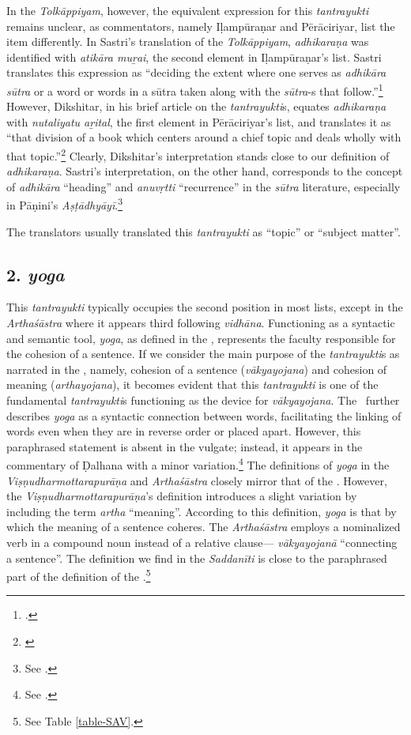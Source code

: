 In the \emph{Tolkāppiyam}, however, the equivalent expression for this \emph{tantrayukti} remains unclear, as commentators, namely Iḷampūraṇar and Pērāciriyar, list the item differently. In Sastri's translation of the \emph{Tolkāppiyam}, \emph{adhikaraṇa} was identified with \emph{atikāra muṟai}, the second element in Iḷampūraṇar's list. Sastri translates this expression as “deciding the extent where one serves as \emph{adhikāra sūtra} or a word or words in a sūtra taken along with the \emph{sūtra}-s that follow.”\footnote{\cite[233]{sast-1936}.} However, Dikshitar, in his brief article on the \emph{tantrayukti}s, equates \emph{adhikaraṇa} with \emph{nutaliyatu aṟital}, the first element in Pērāciriyar's list, and translates it as “that division of a book which centers around a chief topic and deals wholly with that topic.”\footnote{\cite[85]{diks-1930}} Clearly, Dikshitar's interpretation stands close to our definition of \emph{adhikaraṇa}. Sastri's interpretation, on the other hand, corresponds to the concept of \emph{adhikāra} “heading” and \emph{anuvṛtti} “recurrence” in the \emph{sūtra} literature, especially in Pāṇini's \emph{Aṣṭādhyāyī}.\footnote{See \cite[111]{chev-2009}.} 

The translators usually translated this \emph{tantrayukti} as “topic” or “subject matter”. 

\subsection{2. \emph{yoga}}

This \emph{tantrayukti} typically occupies the second position in most lists, except in the \emph{Arthaśāstra} where it appears third following \emph{vidhāna}. Functioning as a syntactic and semantic tool, \emph{yoga}, as defined in the \SS, represents the faculty responsible for the cohesion of a sentence. If we consider the main purpose of the \emph{tantrayukti}s as narrated in the \SS, namely, cohesion of a sentence (\emph{vākyayojana}) and cohesion of meaning (\emph{arthayojana}), it becomes evident that this \emph{tantrayukti} is one of the fundamental \emph{tantrayukti}s functioning as the device for \emph{vākyayojana}. The \SS\ further describes \emph{yoga} as a syntactic connection between words, facilitating the linking of words even when they are in reverse order or placed apart. However, this paraphrased statement is absent in the vulgate; instead, it appears in the commentary of Ḍalhana with a minor variation.\footnote{See .} The definitions of \emph{yoga} in the \emph{Viṣṇudharmottarapurāṇa} and \emph{Arthaśāstra} closely mirror that of the \SS. However, the \emph{Viṣṇudharmottarapurāṇa}'s definition introduces a slight variation by including the term \emph{artha} “meaning”. According to this definition, \emph{yoga} is that by which the meaning of a sentence coheres. The \emph{Arthaśāstra} employs a nominalized verb in a compound noun instead of a relative clause--- \emph{vākyayojanā} “connecting a sentence”. The definition we find in the \emph{Saddanīti} is close to the paraphrased part of the definition of the \SS.\footnote{See Table \ref{table-SAV}.}

